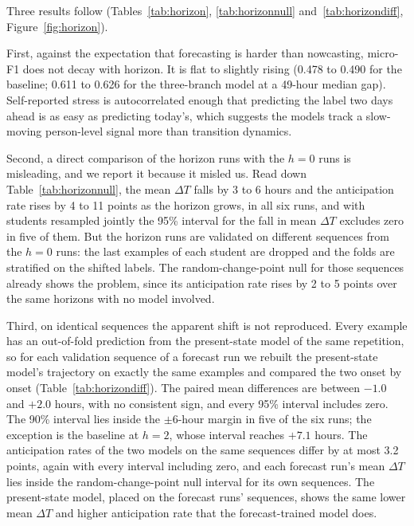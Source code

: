 \documentclass[preprint,12pt,authoryear]{elsarticle}
\newcommand{\dt}{$\Delta T$}
\begin{document}
Three results follow (Tables~\ref{tab:horizon},
\ref{tab:horizonnull} and~\ref{tab:horizondiff},
Figure~\ref{fig:horizon}).

First, against the expectation that forecasting is harder than
nowcasting, micro-F1 does not decay with horizon. It is flat to
slightly rising (0.478 to 0.490 for the baseline; 0.611 to 0.626 for
the three-branch model at a 49-hour median gap). Self-reported stress
is autocorrelated enough that predicting the label two days ahead is as
easy as predicting today's, which suggests the models track a
slow-moving person-level signal more than transition dynamics.

Second, a direct comparison of the horizon runs with the $h = 0$ runs
is misleading, and we report it because it misled us. Read down
Table~\ref{tab:horizonnull}, the mean \dt{} falls by 3 to 6 hours and the
anticipation rate rises by 4 to 11 points as the horizon grows, in all
six runs, and with students resampled jointly the 95\% interval for the
fall in mean \dt{} excludes zero in five of them. But the horizon runs
are validated on different sequences from the $h = 0$ runs: the last
examples of each student are dropped and the folds are stratified on
the shifted labels. The random-change-point null for those sequences
already shows the problem, since its anticipation rate rises by 2 to 5
points over the same horizons with no model involved.

Third, on identical sequences the apparent shift is not reproduced.
Every example has an out-of-fold prediction from the present-state
model of the same repetition, so for each validation sequence of a
forecast run we rebuilt the present-state model's trajectory on exactly
the same examples and compared the two onset by onset
(Table~\ref{tab:horizondiff}). The paired mean differences are between
$-1.0$ and $+2.0$ hours, with no consistent sign, and every 95\%
interval includes zero. The 90\% interval lies inside the $\pm 6$-hour
margin in five of the six runs; the exception is the baseline at
$h = 2$, whose interval reaches $+7.1$ hours. The anticipation rates of
the two models on the same sequences differ by at most 3.2 points,
again with every interval including zero, and each forecast run's mean
\dt{} lies inside the random-change-point null interval for its own
sequences. The present-state model, placed on the forecast runs'
sequences, shows the same lower mean \dt{} and higher anticipation rate
that the forecast-trained model does.
\end{document}
